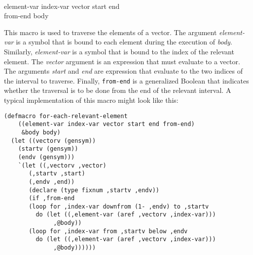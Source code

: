 \\
{element-var index-var vector start end\\
from-end \body body}

This macro is used to traverse the elements of a vector.  The argument
\textit{element-var} is a symbol that is bound to each element during
the execution of \textit{body}.  Similarly, \textit{element-var} is a
symbol that is bound to the index of the relevant element.  The
\textit{vector} argument is an expression that must evaluate to a
vector.  The arguments \textit{start} and \textit{end} are expression
that evaluate to the two indices of the interval to traverse.
Finally, \texttt{from-end} is a generalized Boolean that indicates
whether the traversal is to be done from the end of the relevant
interval.  A typical implementation of this macro might look like
this:

{\small\begin{verbatim}
(defmacro for-each-relevant-element
    ((element-var index-var vector start end from-end)
     &body body)
  (let ((vectorv (gensym))
	(startv (gensym))
	(endv (gensym)))
    `(let ((,vectorv ,vector)
	   (,startv ,start)
	   (,endv ,end))
       (declare (type fixnum ,startv ,endv))
       (if ,from-end
	   (loop for ,index-var downfrom (1- ,endv) to ,startv
		 do (let ((,element-var (aref ,vectorv ,index-var)))
		      ,@body))
	   (loop for ,index-var from ,startv below ,endv
		 do (let ((,element-var (aref ,vectorv ,index-var)))
		      ,@body))))))
\end{verbatim}}
